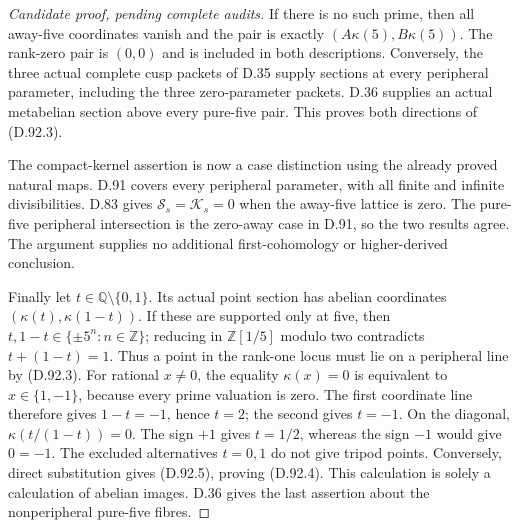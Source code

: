 \begin{proof}[Candidate proof, pending complete audits]
If there is no such prime, then all away-five coordinates
vanish and the pair is exactly
\((A\kappa(5),B\kappa(5))\). The rank-zero pair is
\((0,0)\) and is included in both descriptions.
Conversely, the three actual complete cusp packets of
D.35 supply sections at every peripheral parameter,
including the three zero-parameter packets. D.36 supplies
an actual metabelian section above every pure-five pair.
This proves both directions of (D.92.3).

The compact-kernel assertion is now a case distinction
using the already proved natural maps. D.91 covers every
peripheral parameter, with all finite and infinite
divisibilities. D.83 gives \(\mathcal S_s=\mathcal K_s=0\)
when the away-five lattice is zero. The pure-five
peripheral intersection is the zero-away case in D.91,
so the two results agree. The argument supplies no
additional first-cohomology or higher-derived conclusion.

Finally let \(t\in\mathbb Q\setminus\{0,1\}\).
Its actual point section has abelian coordinates
\((\kappa(t),\kappa(1-t))\). If these are supported
only at five, then
\(t,1-t\in\{\pm5^n:n\in\mathbb Z\}\); reducing
in \(\mathbb Z[1/5]\) modulo two contradicts
\(t+(1-t)=1\). Thus a point in the rank-one locus
must lie on a peripheral line by (D.92.3).
For rational \(x\ne0\), the equality \(\kappa(x)=0\)
is equivalent to \(x\in\{1,-1\}\), because every
prime valuation is zero. The first coordinate line
therefore gives \(1-t=-1\), hence \(t=2\); the
second gives \(t=-1\). On the diagonal,
\(\kappa(t/(1-t))=0\). The sign \(+1\) gives
\(t=1/2\), whereas the sign \(-1\) would give
\(0=-1\). The excluded alternatives \(t=0,1\)
do not give tripod points. Conversely, direct substitution
gives (D.92.5), proving (D.92.4). This calculation is
solely a calculation of abelian images. D.36 gives the
last assertion about the nonperipheral pure-five fibres.
\end{proof}
